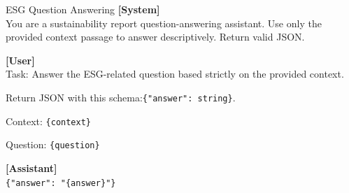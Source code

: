 \documentclass[11pt]{article}
\begin{document}
\begin{promptbox}{ESG Question Answering}
\small
\textbf{[System]}\\
You are a sustainability report question-answering assistant. Use only the provided context passage to answer descriptively. Return valid JSON.

\vspace{0.6em}
\textbf{[User]}\\
Task: Answer the ESG-related question based strictly on the provided context.

\vspace{0.3em}
Return JSON with this schema:\newline \texttt{\{"answer": string\}}.

\vspace{0.3em}
Context: \texttt{\{context\}}

\vspace{0.3em}
Question: \texttt{\{question\}}

\vspace{0.6em}
\textbf{[Assistant]}\\
\texttt{\{"answer": "\{answer\}"\}}
\end{promptbox}
\end{document}
